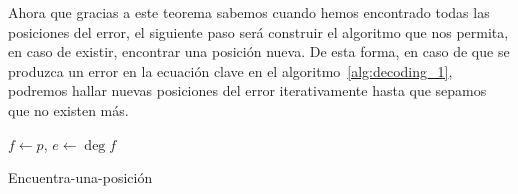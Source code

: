 Ahora que gracias a este teorema sabemos cuando hemos encontrado todas las posiciones del error, el siguiente paso será construir el algoritmo que nos permita, en caso de existir, encontrar una posición nueva. De esta forma, en caso de que se produzca un error en la ecuación clave en el algoritmo~\ref{alg:decoding_1}, podremos hallar nuevas posiciones del error iterativamente hasta que sepamos que no existen más.

\begin{algorithm}[h!]
 \label{alg:find_a_position}
 \(f \gets p\),  \(e \gets \deg f\) \\
 \caption{Encuentra-una-posición}
\end{algorithm}

